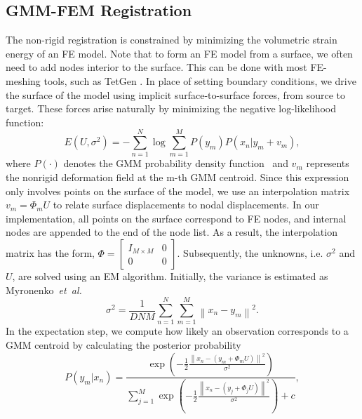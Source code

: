\documentclass[journal]{IEEEtran}
\begin{document}
\subsection{GMM-FEM Registration}
The non-rigid registration is constrained by minimizing the volumetric strain energy of an FE model. Note that to form an FE model from a surface, we often need to add nodes interior to the surface. This can be done with most FE-meshing tools, such as TetGen \cite{Si06a}. In place of setting boundary conditions, we drive the surface of the model using implicit surface-to-surface forces, from source to target. These forces arise naturally by minimizing the negative log-likelihood function: 
\begin{equation} \label{eq:loglike}
E(U,\sigma^2) = -\sum_{n=1}^N\log\sum_{m=1}^MP(y_m)P(x_n|y_m+v_m),
\end{equation}
where $P(\cdot)$ denotes the GMM probability density function~\cite{Myronenko10a} and $v_m$ represents the nonrigid deformation field at the m-th GMM centroid. Since this expression only involves points on the surface of the model, we use an interpolation matrix $v_m={\Phi_m}U$ to relate surface displacements to nodal displacements. In our implementation, all points on the surface correspond to FE nodes, and internal nodes are appended to the end of the node list. As a result, the interpolation matrix has the form, $\Phi=\begin{bmatrix} I_{M\times M} & 0\\ 0 & 0 \end{bmatrix}$.   Subsequently, the unknowns, i.e. $\sigma^2$ and $U$, are solved using an EM algorithm. Initially, the variance is estimated as Myronenko~\textit{et~al.}~\cite{Myronenko10a}
\begin{equation} \label{eq:initVariance}
\sigma^2 = \frac{1}{DNM}\sum_{n=1}^{N}\sum_{m=1}^{M}\left\|x_n-y_m\right\|^2.
\end{equation}
In the expectation step, we compute how likely an observation corresponds to a GMM centroid by calculating the posterior probability
\begin{equation} \label{eq:prob}
P(y_m|x_n) = \frac{\exp{\left(-\frac{1}{2}\frac{\left\|x_n -(y_m+\Phi_mU)\right\|^2}{\sigma^2}\right)}}{\sum_{j=1}^M\exp{\left(-\frac{1}{2}\frac{\left\|x_n -(y_j+\Phi_jU)\right\|^2}{\sigma^2}\right)} + c},
\end{equation}
\end{document}
